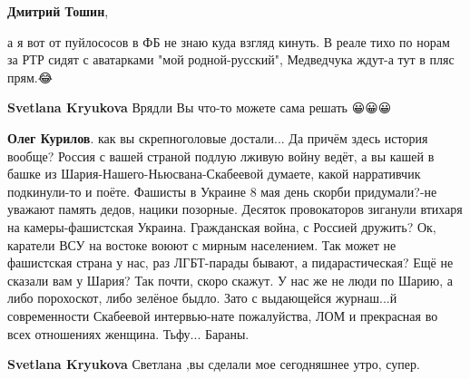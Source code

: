 \begin{itemize}
\begin{itemize}
 
\textbf{Дмитрий Тошин}, 

а я вот от пуйлососов в ФБ не знаю куда взгляд кинуть. В реале тихо по норам за
РТР сидят с аватарками "мой родной-русский", Медведчука ждут-а тут в пляс
прям.😂

 
\textbf{Svetlana Kryukova}
Врядли Вы что-то можете сама решать 😀😀😀

 

\textbf{Олег Курилов}. как вы скрепноголовые достали... Да причём здесь история
вообще? Россия с вашей страной подлую лживую войну ведёт, а вы кашей в башке из
Шария-Нашего-Ньюсвана-Скабеевой думаете, какой нарративчик подкинули-то и
поёте. Фашисты в Украине 8 мая день скорби придумали?-не уважают память дедов,
нацики позорные. Десяток провокаторов зиганули втихаря на камеры-фашистская
Украина. Гражданская война, с Россией дружить? Ок, каратели ВСУ на востоке
воюют с мирным населением. Так может не фашистская страна у нас, раз
ЛГБТ-парады бывают, а пидарастическая? Ещё не сказали вам у Шария? Так почти,
скоро скажут. У нас же не люди по Шарию, а либо порохоскот, либо зелёное быдло.
Зато с выдающейся журнаш...й современности Скабеевой интервью-нате пожалуйства,
ЛОМ и прекрасная во всех отношениях женщина. Тьфу... Бараны.


 
\textbf{Svetlana Kryukova} Светлана ,вы сделали мое сегодняшнее утро, супер.

 

\end{itemize}
\end{itemize}
